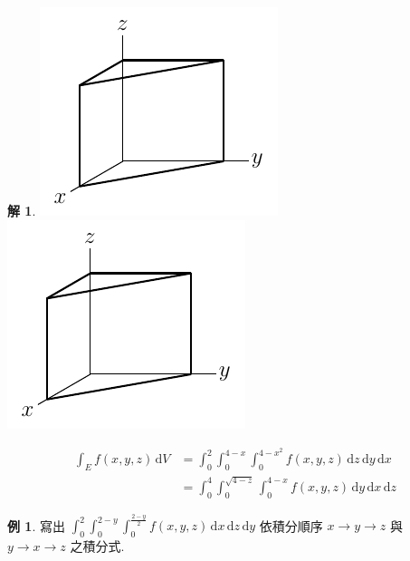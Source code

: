 \documentclass[12pt]{extarticle}
\newcommand{\ds}{\displaystyle}
\theoremstyle{definition}
\newtheorem*{ex}{例}
\newtheorem*{sol}{解}
\begin{document}
{\begin{sol}
\begin{minipage}{0.15\textwidth}
  \end{minipage}
  \begin{minipage}{0.25\textwidth}
    \includegraphics[scale=0.6,page=4]{fig/text.pdf} \\
    \includegraphics[scale=0.6,page=5]{fig/text.pdf}
  \end{minipage}
  \begin{minipage}{0.6\textwidth}
    \begin{align*}
      \int_E f(x, y, z)\,\text{d}V 
      &= \int_0^2\!\!\int_0^{4 - x}\!\!\int_0^{4 - x^2}\!\!f(x, y, z)\,\text{d}z\,\text{d}y\,\text{d}x \\
      &= \int_0^4\!\!\int_0^{\sqrt{4 - z}}\!\!\int_0^{4 - x}\!\!f(x, y, z)\,\text{d}y\,\text{d}x\,\text{d}z
    \end{align*}
  \end{minipage}
\end{sol}

\begin{ex}
  寫出 $\ds\int_0^2\!\int_0^{2 - y}\!\!\int_{0}^{\frac{2 - y}{2}}\!\!f(x, y, z)\,\text{d}x\,\text{d}z\,\text{d}y$ 依積分順序 $x\to y\to z$ 與 $y\to x\to z$ 之積分式.
\end{ex}

}
\end{document}
